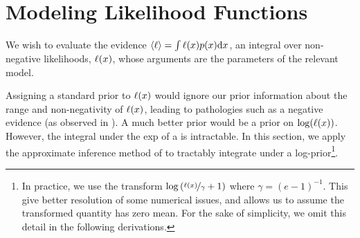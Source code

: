 \documentclass{article}
\begin{document}
\section{Modeling Likelihood Functions}

We wish to evaluate the evidence $\inty{\lfn} = \int \lfn(\lfv) p(\lfv) \ud\lfv$, an integral over non-negative likelihoods, $\lfn(\lfv)$, whose arguments are the parameters of the relevant model.



Assigning a standard \gpb prior to $\lfn(\lfv)$ would ignore our prior information about the range and non-negativity of $\lfn(\lfv)$, leading to pathologies such as a negative evidence (as observed in \citet{BZMonteCarlo}).  A much better prior would be a \gpb prior on $\log(\lfn(x))$.  However, the integral under the exp of a \gpb is intractable.  In this section, we apply the approximate inference method of \citep{BQR} to tractably integrate under a log-\gpb prior\footnote{In practice, we use the transform 
$\log\left(\nicefrac{\lfn(\lfv)}{\gamma} + 1\right)$
where $\gamma = (e-1)^{-1}$.  This give better resolution of some numerical issues, and allows us to assume the transformed quantity has zero mean. For the sake of simplicity, we omit this detail in the following derivations.}.


\end{document}
